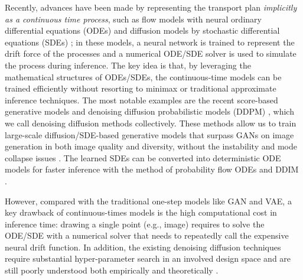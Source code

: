 \documentclass[11pt]{article}
\begin{document}
Recently, advances have been made by representing 
the transport plan 
\emph{implicitly as a continuous time  process}, such as 
flow models with neural ordinary differential equations (ODEs) \citep[e.g.,][]{chen2018neural, papamakarios2021normalizing} and  diffusion models by stochastic differential equations (SDEs) \citep[e.g.,][]{song2020score, ho2020denoising, tzen2019theoretical, de2021diffusion, vargas2021solving};
in these models, 
a neural network 
is trained to represent the 
drift force of the processes
and a numerical ODE/SDE solver is used to simulate the process during inference. 
The key idea is that, 
by leveraging the mathematical structures of ODEs/SDEs, 
the continuous-time models 
can be trained efficiently without 
resorting to minimax or traditional approximate inference techniques. 
The most notable examples are 
the recent score-based generative models \cite{song2019generative, song2020improved, song2020score} 
and denoising diffusion probabilistic models (DDPM) \citep{ho2020denoising}, 
which we call denoising diffusion methods collectively. 
These methods 
allow us to train 
large-scale diffusion/SDE-based generative models that 
surpass GANs on image generation in both image quality and diversity,
without the instability and mode collapse issues
\citep[e.g.,][]{dhariwal2021diffusion, glide, dalle2, imagegen}.  
The learned SDEs can be converted into deterministic ODE models  for faster inference with the method of probability flow ODEs \citep{song2020score} and DDIM \citep{song2020denoising}. 

However, compared with the traditional one-step models like GAN and VAE, 
a key drawback of  continuous-times models %
is the 
high computational cost in inference time: drawing a single point (e.g., image) requires to solve the ODE/SDE with a numerical solver that needs to repeatedly call the expensive neural drift function. 
In addition, the existing denoising diffusion techniques 
require substantial hyper-parameter search in an involved design space 
and are still poorly understood both empirically and theoretically \citep{elucidating}. 
\end{document}
